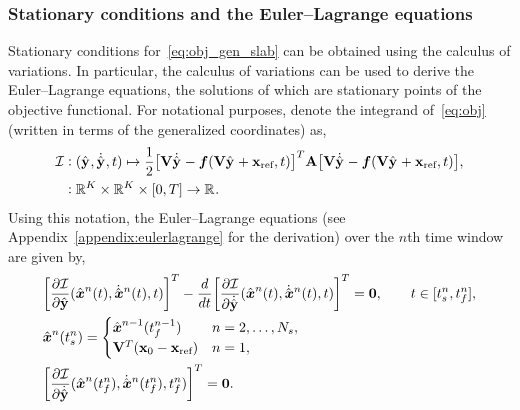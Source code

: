 \subsubsection{Stationary conditions and the Euler--Lagrange equations}
Stationary conditions for~\eqref{eq:obj_gen_slab} can be obtained using the
calculus of variations. In particular, the calculus of variations can be used
to derive the Euler--Lagrange equations, the solutions of which are stationary 
points of the objective functional. For notational purposes, denote the
integrand of~\eqref{eq:obj} (written in terms of the generalized
coordinates) as, 
\begin{equation}\label{eq:integrand}
\begin{split}
 \minintegrandArg{n} & \vcentcolon
(\genstateyDiscreteArgnt{}, \genstateyDiscreteDotArgnt{},t) \mapsto \frac{1}{2} \big[
\basisspace \genstateyDiscreteDotArgnt{} - \velocity(\basisspace \genstateyDiscreteArgnt{}
+ \stateIntercept,t) \big]^T \stweightingMatArgt{n}{t} \big[
\basisspace \genstateyDiscreteDotArgnt{}  - \velocity(\basisspace \genstateyDiscreteArgnt{} +
\stateIntercept,t) \big], \\ & \vcentcolon \RR{\romdim} \times \RR{\romdim} \times [0,T]
 \rightarrow \RR{} .  
\end{split}
\end{equation}
Using this notation, the Euler--Lagrange equations (see
Appendix~\ref{appendix:eulerlagrange} for the derivation) over the $n$th
time window are given by, 
\begin{equation}\label{eq:el1} 
\begin{split}
& \bigg[\frac{\partial
\minintegrandArg{n}}{\partial
\genstateyDiscrete}(\genstateArg{n}{t},\genstateDotArg{n}{t},t) \bigg]^T - \frac{d}{dt}
\bigg[ \frac{\partial \minintegrandArg{n}}{\partial \genstateyDiscreteDotArgnt{}}
(\genstateArg{n}{t},\genstateDotArg{n}{t} ,t) \bigg]^T = \bz, \qquad t \in [\timeStartArg{n},\timeEndArg{n}],\\ 
&\genstate^n(\timeStartArg{n})  = \begin{cases} 
\genstate^{n-1}(\timeEndArg{n-1}) &
n=2,\ldots,\nslabs, \\ 
\basisspace^T(\stateFOMIC - \stateIntercept) & n=1,
\end{cases}\\ 
&\bigg[ \frac{\partial \minintegrandArg{n}}{\partial \genstateyDiscreteDotArgnt{}}(\genstateArg{n}{\timeEndArg{n}},\genstateDotArg{n}{\timeEndArg{n}},\timeEndArg{n})\bigg]^T =
\bz.\end{split} 
\end{equation}
